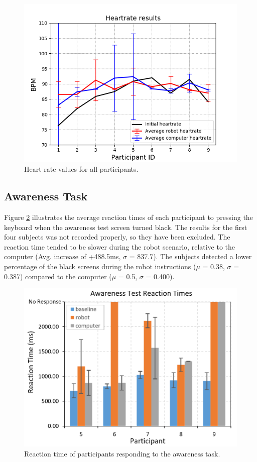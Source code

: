 \documentclass[conference]{IEEEtran}
\begin{document}
\begin{figure}[h]
	\flushleft 
	\includegraphics[width=1.05\linewidth]{figures/heartrate.png}
	\caption{\label{fig:heart_rate}Heart rate values for all participants.}  
\end{figure}

\subsection{Awareness Task}
Figure \ref{fig:awareness_reaction} illustrates the average reaction times of each participant to pressing the keyboard when the awareness test screen turned black. The results for the first four subjects was not recorded properly, so they have been excluded. The reaction time tended to be slower during the robot scenario, relative to the computer (Avg. increase of +488.5ms, $\sigma$ = 837.7). The subjects detected a lower percentage of the black screens during the robot instructions ($\mu$ = 0.38, $\sigma$  = 0.387) compared to the computer ($\mu$ = 0.5, $\sigma$  = 0.400).

\begin{figure}[h]
	\flushleft 
	\includegraphics[width=1\linewidth]{figures/awareness_reactions.png}
	\caption{\label{fig:awareness_reaction}Reaction time of participants responding to the awareness task.}  
\end{figure}
\end{document}
